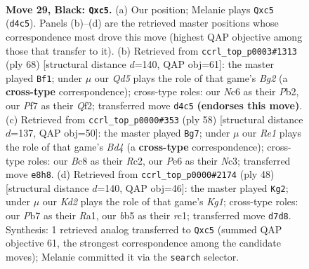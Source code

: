 \documentclass[11pt]{article}
\begin{document}
\clearpage

\begin{figure}[p]\centering
\begin{subfigure}{0.46\textwidth}\centering
\resizebox{\linewidth}{!}{%
\newchessgame
\chessboard[
  setfen={r1b1r3/1p1k1p1R/2n1p1Q1/pBP1P3/P2q1P2/8/4K3/2B3N1 b - - 2 29},
  showmover=false,
  pgfstyle=straightmove, color=movearrow, markmove={d4-c5}
]}
\caption{}
\end{subfigure}\hfill
\begin{subfigure}{0.46\textwidth}\centering
\resizebox{\linewidth}{!}{%
\newchessgame
\chessboard[
  setfen={1k6/1p6/2p2p2/p3b2p/P7/1qNRP1r1/1P3QB1/1K6 w - - 6 35},
  showmover=false,
  pgfstyle=straightmove, color=movearrow, markmove={g2-f1}
]}
\caption{}
\end{subfigure}
\\[4pt]
\begin{subfigure}{0.46\textwidth}\centering
\resizebox{\linewidth}{!}{%
\newchessgame
\chessboard[
  setfen={2r1k3/1b3r2/4p1Qp/p4p1P/1b1B1R2/1qNP4/1PRK4/8 w - - 2 30},
  showmover=false,
  pgfstyle=straightmove, color=movearrow, markmove={d4-g7}
]}
\caption{}
\end{subfigure}\hfill
\begin{subfigure}{0.46\textwidth}\centering
\resizebox{\linewidth}{!}{%
\newchessgame
\chessboard[
  setfen={5k2/1p4pp/p2bP3/8/3p4/3Qq1P1/PP5P/RNr2BK1 w - - 1 25},
  showmover=false,
  pgfstyle=straightmove, color=movearrow, markmove={g1-g2}
]}
\caption{}
\end{subfigure}
\caption{\textbf{Move 29, Black: \texttt{Qxc5}.} (a) Our position; Melanie plays \texttt{Qxc5} (\texttt{d4c5}). Panels (b)--(d) are the retrieved master positions whose correspondence most drove this move (highest QAP objective among those that transfer to it). (b) Retrieved from \texttt{ccrl\_top\_p0003\#1313} (ply 68) [structural distance $d$=140, QAP obj=61]: the master played \texttt{Bf1}; under $\mu$ our \emph{Qd5} plays the role of that game's \emph{Bg2} (a \textbf{cross-type} correspondence); cross-type roles: our \emph{N}c6 as their \emph{P}b2, our \emph{P}f7 as their \emph{Q}f2; transferred move \texttt{d4c5} \textbf{(endorses this move)}. (c) Retrieved from \texttt{ccrl\_top\_p0000\#353} (ply 58) [structural distance $d$=137, QAP obj=50]: the master played \texttt{Bg7}; under $\mu$ our \emph{Re1} plays the role of that game's \emph{Bd4} (a \textbf{cross-type} correspondence); cross-type roles: our \emph{B}c8 as their \emph{R}c2, our \emph{P}e6 as their \emph{N}c3; transferred move \texttt{e8h8}. (d) Retrieved from \texttt{ccrl\_top\_p0000\#2174} (ply 48) [structural distance $d$=140, QAP obj=46]: the master played \texttt{Kg2}; under $\mu$ our \emph{Kd2} plays the role of that game's \emph{Kg1}; cross-type roles: our \emph{P}b7 as their \emph{R}a1, our \emph{b}b5 as their \emph{r}c1; transferred move \texttt{d7d8}. Synthesis: 1 retrieved analog transferred to \texttt{Qxc5} (summed QAP objective 61, the strongest correspondence among the candidate moves); Melanie committed it via the \texttt{search} selector.}
\label{fig:thought-m57}
\end{figure}
\end{document}
